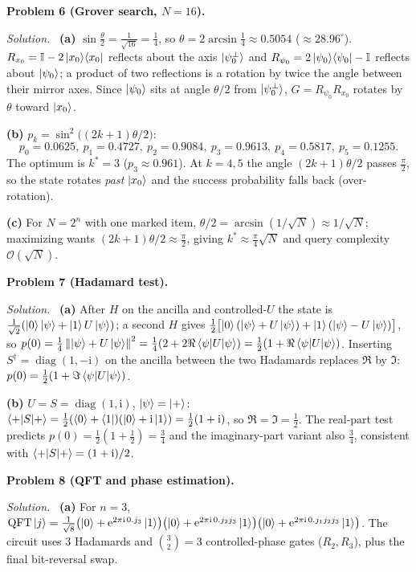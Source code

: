\documentclass[11pt]{article}
\newcommand{\ii}{\mathrm{i}}
\newcommand{\ee}{\mathrm{e}}
\DeclareMathOperator{\diag}{diag}
\newcommand{\norm}[1]{\left\lVert #1 \right\rVert}
\newcommand{\bigo}{\mathcal{O}}
\newcommand{\id}{\mathbb{I}}
\newcommand{\dg}{^{\dagger}}
\newcommand{\proj}[1]{\ket{#1}\!\bra{#1}}
\newcommand{\QFT}{\mathrm{QFT}}
\newcommand{\sol}{\smallskip\noindent\textit{Solution.}\ }
\newcommand{\problem}[1]{\bigskip\noindent\textbf{Problem #1.}\ }
\begin{document}
\problem{6 (Grover search, $N=16$)}

\sol
\textbf{(a)} $\sin\tfrac\theta2=\tfrac1{\sqrt{16}}=\tfrac14$, so
$\theta=2\arcsin\tfrac14\approx0.5054$ ($\approx28.96^\circ$). $R_{x_0}=\id-2\proj{x_0}$
reflects about the axis $\ket{\psi_0^\perp}$ and $R_{\psi_0}=2\proj{\psi_0}-\id$
reflects about $\ket{\psi_0}$; a product of two reflections is a rotation by twice the
angle between their mirror axes. Since $\ket{\psi_0}$ sits at angle $\theta/2$ from
$\ket{\psi_0^\perp}$, $G=R_{\psi_0}R_{x_0}$ rotates by $\theta$ toward $\ket{x_0}$.

\textbf{(b)} $p_k=\sin^2\!\bigl((2k+1)\theta/2\bigr)$:
\[
 p_0=0.0625,\ p_1=0.4727,\ p_2=0.9084,\ p_3=0.9613,\ p_4=0.5817,\ p_5=0.1255 .
\]
The optimum is $k^\ast=3$ ($p_3\approx0.961$). At $k=4,5$ the angle
$(2k+1)\theta/2$ passes $\tfrac\pi2$, so the state rotates \emph{past} $\ket{x_0}$ and
the success probability falls back (over-rotation).

\textbf{(c)} For $N=2^n$ with one marked item, $\theta/2=\arcsin(1/\sqrt N)\approx
1/\sqrt N$; maximizing wants $(2k+1)\theta/2\approx\tfrac\pi2$, giving
$k^\ast\approx\tfrac{\pi}{4}\sqrt N$ and query complexity $\bigo(\sqrt N)$.

\problem{7 (Hadamard test)}

\sol
\textbf{(a)} After $H$ on the ancilla and controlled-$U$ the state is
$\tfrac1{\sqrt2}(\ket0\ket\psi+\ket1 U\ket\psi)$; a second $H$ gives
$\tfrac12\bigl[\ket0(\ket\psi+U\ket\psi)+\ket1(\ket\psi-U\ket\psi)\bigr]$, so
$p(0)=\tfrac14\norm{\ket\psi+U\ket\psi}^2=\tfrac14(2+2\Re\braket{\psi|U|\psi})
=\tfrac12(1+\Re\braket{\psi|U|\psi})$. Inserting $S\dg=\diag(1,-\ii)$ on the ancilla
between the two Hadamards replaces $\Re$ by $\Im$: $p(0)=\tfrac12(1+\Im\braket{\psi|U|\psi})$.

\textbf{(b)} $U=S=\diag(1,\ii)$, $\ket\psi=\ket+$:
$\braket{+|S|+}=\tfrac12(\braket0+\bra1)(\ket0+\ii\ket1)=\tfrac12(1+\ii)$, so
$\Re=\Im=\tfrac12$. The real-part test predicts $p(0)=\tfrac12(1+\tfrac12)=\tfrac34$ and
the imaginary-part variant also $\tfrac34$, consistent with $\braket{+|S|+}=(1+\ii)/2$.

\problem{8 (QFT and phase estimation)}

\sol
\textbf{(a)} For $n=3$,
$\QFT\ket{j}=\tfrac1{\sqrt8}\bigl(\ket0+\ee^{2\pi\ii\,0.j_3}\ket1\bigr)
\bigl(\ket0+\ee^{2\pi\ii\,0.j_2j_3}\ket1\bigr)
\bigl(\ket0+\ee^{2\pi\ii\,0.j_1j_2j_3}\ket1\bigr)$. The circuit uses $3$ Hadamards and
$\binom32=3$ controlled-phase gates ($R_2,R_3$), plus the final bit-reversal swap.
\end{document}
